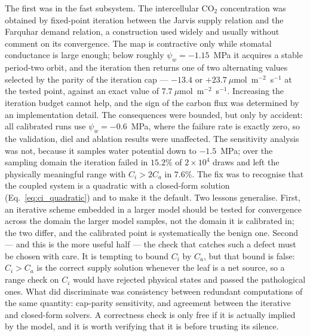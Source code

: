 \documentclass[a4paper,fleqn]{cas-sc}
\begin{document}
The first was in the fast subsystem. The intercellular CO$_2$ concentration
was obtained by fixed-point iteration between the Jarvis supply relation and
the Farquhar demand relation, a construction used widely and usually without
comment on its convergence. The map is contractive only while stomatal
conductance is large enough; below roughly $\psi_w = -1.15$~MPa it acquires a
stable period-two orbit, and the iteration then returns one of two alternating
values selected by the parity of the iteration cap --- $-13.4$ or
$+23.7~\mu$mol~m$^{-2}$~s$^{-1}$ at the tested point, against an exact value
of $7.7~\mu$mol~m$^{-2}$~s$^{-1}$. Increasing the iteration budget cannot help, and the
sign of the carbon flux was determined by an implementation detail. The
consequences were bounded, but only by accident: all calibrated runs use
$\psi_w = -0.6$~MPa, where the failure rate is exactly zero, so the
validation, diel and ablation results were unaffected. The sensitivity
analysis was not, because it samples water potential down to $-1.5$~MPa; over
the sampling domain the iteration failed in $15.2\%$ of $2\times10^{4}$ draws
and left the physically meaningful range with $C_i > 2C_a$ in $7.6\%$. The fix was to
recognise that the coupled system is a quadratic with a closed-form solution
(Eq.~\eqref{eq:ci_quadratic}) and to make it the default. Two lessons
generalise. First, an iterative scheme embedded in a larger model should be
tested for convergence across the domain the larger model samples, not the
domain it is calibrated in; the two differ, and the calibrated point is
systematically the benign one. Second --- and this is the more useful half ---
the check that catches such a defect must be chosen with care. It is tempting
to bound $C_i$ by $C_a$, but that bound is false: $C_i > C_a$ is the correct
supply solution whenever the leaf is a net source, so a range check on $C_i$
would have rejected physical states and passed the pathological ones. What
did discriminate was consistency between redundant computations of the same
quantity: cap-parity sensitivity, and agreement between the iterative and
closed-form solvers. A correctness check is only free if it is actually
implied by the model, and it is worth verifying that it is before trusting
its silence.
\end{document}
